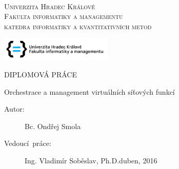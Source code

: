 \documentclass[a4paper,czech,czech,openright,cleardoubleempty,BCOR10mm,DIV11]{scrreprt}
\newcommand{\noun}[1]{\textsc{#1}}
\begin{document}
\cleardoublepage{}~\thispagestyle{empty}\begin{center}\vspace{10mm}


\textsf{\textsc{\noun{\LARGE Univerzita Hradec Králové}}}\\
\vspace{0.5em}
\textsc{\noun{\LARGE Fakulta informatiky a managementu}}\\
\vspace*{1em}
\textsf{\textsc{\noun{\Large katedra informatiky a kvantitativních metod }}}

\vspace{15mm}

\includegraphics[width=0.4\textwidth]{logos/uhk}

\vspace{15mm}


\textsf{\huge DIPLOMOVÁ PRÁCE}{\huge \par}

\vspace{15mm}


\textsf{\LARGE Orchestrace a management virtuálních síťových funkcí}{\LARGE \par}

\vspace{10mm}


\end{center} 

\vspace*{\fill}


\vspace{10mm}

\begin{description}
\item [{{\large Autor:}}] \noindent \textsf{\large Bc. Ondřej Smola}{\large \par}
\item [{{\large Vedoucí~práce:}}] \noindent \textsf{\large Ing. Vladimír Soběslav, Ph.D.}{\large \hfill{}}\textsf{\large duben, 2016}{\large{}
}{\large \par}
\end{description}
\clearpage{}


\newpage{}\thispagestyle{plain}
\end{document}
